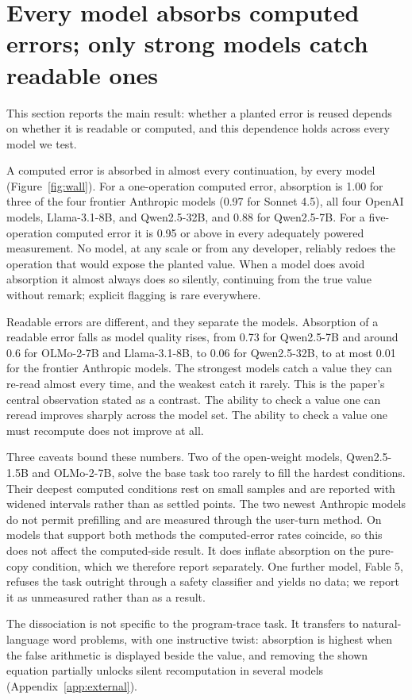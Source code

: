 \section{Every model absorbs computed errors; only strong models catch readable ones}
\label{sec:wall}

This section reports the main result: whether a planted error is reused depends on whether it is readable or computed, and this dependence holds across every model we test.

A computed error is absorbed in almost every continuation, by every model (Figure~\ref{fig:wall}). For a one-operation computed error, absorption is 1.00 for three of the four frontier Anthropic models (0.97 for Sonnet 4.5), all four OpenAI models, Llama-3.1-8B, and Qwen2.5-32B, and 0.88 for Qwen2.5-7B. For a five-operation computed error it is 0.95 or above in every adequately powered measurement. No model, at any scale or from any developer, reliably redoes the operation that would expose the planted value. When a model does avoid absorption it almost always does so silently, continuing from the true value without remark; explicit flagging is rare everywhere.

Readable errors are different, and they separate the models. Absorption of a readable error falls as model quality rises, from 0.73 for Qwen2.5-7B and around 0.6 for OLMo-2-7B and Llama-3.1-8B, to 0.06 for Qwen2.5-32B, to at most 0.01 for the frontier Anthropic models. The strongest models catch a value they can re-read almost every time, and the weakest catch it rarely. This is the paper's central observation stated as a contrast. The ability to check a value one can reread improves sharply across the model set. The ability to check a value one must recompute does not improve at all.

Three caveats bound these numbers. Two of the open-weight models, Qwen2.5-1.5B and OLMo-2-7B, solve the base task too rarely to fill the hardest conditions. Their deepest computed conditions rest on small samples and are reported with widened intervals rather than as settled points. The two newest Anthropic models do not permit prefilling and are measured through the user-turn method. On models that support both methods the computed-error rates coincide, so this does not affect the computed-side result. It does inflate absorption on the pure-copy condition, which we therefore report separately. One further model, Fable 5, refuses the task outright through a safety classifier and yields no data; we report it as unmeasured rather than as a result.

The dissociation is not specific to the program-trace task. It transfers to natural-language word problems, with one instructive twist: absorption is highest when the false arithmetic is displayed beside the value, and removing the shown equation partially unlocks silent recomputation in several models (Appendix~\ref{app:external}).
